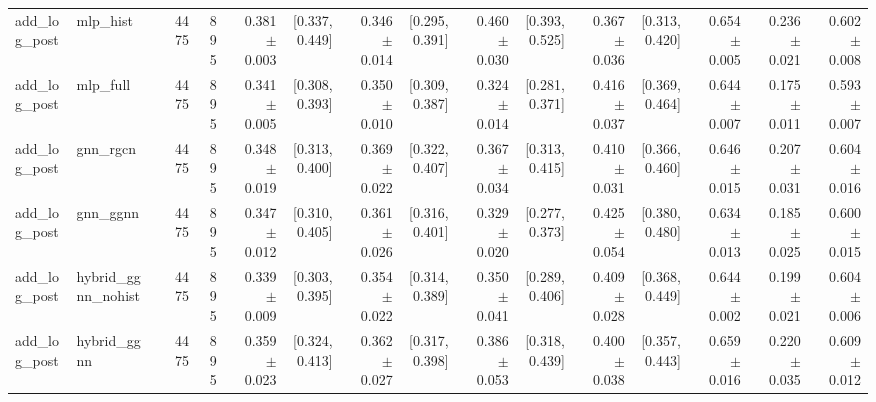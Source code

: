 \begin{table}[htbp]
{\begin{tabular}{llrrrrrrrrrrrrrr}
add\_log\_post & mlp\_hist &  & 4475 & 895 & 0.381 $\pm$ 0.003 & [0.337, 0.449] & 0.346 $\pm$ 0.014 & [0.295, 0.391] & 0.460 $\pm$ 0.030 & [0.393, 0.525] & 0.367 $\pm$ 0.036 & [0.313, 0.420] & 0.654 $\pm$ 0.005 & 0.236 $\pm$ 0.021 & 0.602 $\pm$ 0.008 \\
add\_log\_post & mlp\_full &  & 4475 & 895 & 0.341 $\pm$ 0.005 & [0.308, 0.393] & 0.350 $\pm$ 0.010 & [0.309, 0.387] & 0.324 $\pm$ 0.014 & [0.281, 0.371] & 0.416 $\pm$ 0.037 & [0.369, 0.464] & 0.644 $\pm$ 0.007 & 0.175 $\pm$ 0.011 & 0.593 $\pm$ 0.007 \\
add\_log\_post & gnn\_rgcn &  & 4475 & 895 & 0.348 $\pm$ 0.019 & [0.313, 0.400] & 0.369 $\pm$ 0.022 & [0.322, 0.407] & 0.367 $\pm$ 0.034 & [0.313, 0.415] & 0.410 $\pm$ 0.031 & [0.366, 0.460] & 0.646 $\pm$ 0.015 & 0.207 $\pm$ 0.031 & 0.604 $\pm$ 0.016 \\
add\_log\_post & gnn\_ggnn &  & 4475 & 895 & 0.347 $\pm$ 0.012 & [0.310, 0.405] & 0.361 $\pm$ 0.026 & [0.316, 0.401] & 0.329 $\pm$ 0.020 & [0.277, 0.373] & 0.425 $\pm$ 0.054 & [0.380, 0.480] & 0.634 $\pm$ 0.013 & 0.185 $\pm$ 0.025 & 0.600 $\pm$ 0.015 \\
add\_log\_post & hybrid\_ggnn\_nohist &  & 4475 & 895 & 0.339 $\pm$ 0.009 & [0.303, 0.395] & 0.354 $\pm$ 0.022 & [0.314, 0.389] & 0.350 $\pm$ 0.041 & [0.289, 0.406] & 0.409 $\pm$ 0.028 & [0.368, 0.449] & 0.644 $\pm$ 0.002 & 0.199 $\pm$ 0.021 & 0.604 $\pm$ 0.006 \\
add\_log\_post & hybrid\_ggnn &  & 4475 & 895 & 0.359 $\pm$ 0.023 & [0.324, 0.413] & 0.362 $\pm$ 0.027 & [0.317, 0.398] & 0.386 $\pm$ 0.053 & [0.318, 0.439] & 0.400 $\pm$ 0.038 & [0.357, 0.443] & 0.659 $\pm$ 0.016 & 0.220 $\pm$ 0.035 & 0.609 $\pm$ 0.012 \\
\bottomrule
\end{tabular}}
\end{table}
